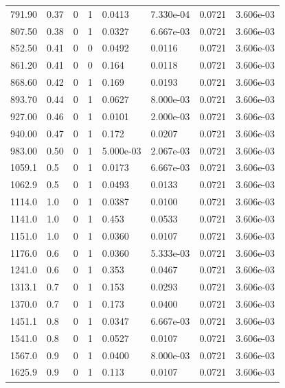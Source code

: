 \documentclass[preview]{standalone}
\begin{document}
{{{\begin{tabular}{L{1.2cm}C{1.2cm} C{0.3cm}C{0.5cm} C{1.4cm}C{1.4cm} C{1.4cm}C{1.4cm}}
  791.90  &  0.37  & 0     &  1 &  0.0413  & 7.330e-04  & 0.0721 &  3.606e-03   \\ 
  807.50  &  0.38  & 0     &  1 &  0.0327  & 6.667e-03  & 0.0721 &  3.606e-03   \\ 
  852.50  &  0.41  & 0     &  0 &  0.0492  & 0.0116  & 0.0721 &  3.606e-03   \\ 
  861.20  &  0.41  & 0     &  0 &  0.164  & 0.0118  & 0.0721 &  3.606e-03   \\ 
  868.60  &  0.42  & 0     &  1 &  0.169  & 0.0193  & 0.0721 &  3.606e-03   \\ 
  893.70  &  0.44  & 0     &  1 &  0.0627  & 8.000e-03  & 0.0721 &  3.606e-03   \\ 
  927.00  &  0.46  & 0     &  1 &  0.0101  & 2.000e-03  & 0.0721 &  3.606e-03   \\ 
  940.00  &  0.47  & 0     &  1 &  0.172  & 0.0207  & 0.0721 &  3.606e-03   \\ 
  983.00  &  0.50  & 0     &  1 &  5.000e-03  & 2.067e-03  & 0.0721 &  3.606e-03   \\ 
  1059.1  &   0.5  & 0     &  1 &  0.0173  & 6.667e-03  & 0.0721 &  3.606e-03   \\ 
  1062.9  &   0.5  & 0     &  1 &  0.0493  & 0.0133  & 0.0721 &  3.606e-03   \\ 
  1114.0  &   1.0  & 0     &  1 &  0.0387  & 0.0100  & 0.0721 &  3.606e-03   \\ 
  1141.0  &   1.0  & 0     &  1 &  0.453  & 0.0533  & 0.0721 &  3.606e-03   \\ 
  1151.0  &   1.0  & 0     &  1 &  0.0360  & 0.0107  & 0.0721 &  3.606e-03   \\ 
  1176.0  &   0.6  & 0     &  1 &  0.0360  & 5.333e-03  & 0.0721 &  3.606e-03   \\ 
  1241.0  &   0.6  & 0     &  1 &  0.353  & 0.0467  & 0.0721 &  3.606e-03   \\ 
  1313.1  &   0.7  & 0     &  1 &  0.153  & 0.0293  & 0.0721 &  3.606e-03   \\ 
  1370.0  &   0.7  & 0     &  1 &  0.173  & 0.0400  & 0.0721 &  3.606e-03   \\ 
  1451.1  &   0.8  & 0     &  1 &  0.0347  & 6.667e-03  & 0.0721 &  3.606e-03   \\ 
  1541.0  &   0.8  & 0     &  1 &  0.0527  & 0.0107  & 0.0721 &  3.606e-03   \\ 
  1567.0  &   0.9  & 0     &  1 &  0.0400  & 8.000e-03  & 0.0721 &  3.606e-03   \\ 
  1625.9  &   0.9  & 0     &  1 &  0.113  & 0.0107  & 0.0721 &  3.606e-03   \\ 

\end{tabular}}}}
\end{document}
